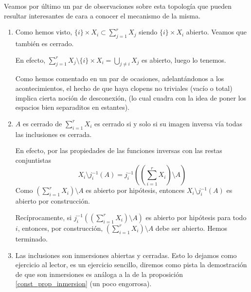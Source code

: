 \begin{obs}
	\label{const_obs_propiedadesSuma}
	Veamos por último un par de observaciones sobre esta topología que pueden resultar interesantes de cara a conocer el mecanismo de la misma.
	\begin{enumerate}
	\item Como hemos visto, $\{i\}\times X_i\subset\sum_{j=1}^r X_j$ siendo $\{i\}\times X_i$ abierto. Veamos que también es cerrado.
	
	En efecto, $\sum_{j=1}^r X_j\setminus \{i\}\times X_i=\bigcup_{j\ne i }X_j$ es abierto, luego lo tenemos.
	
	Como hemos comentado en un par de ocasiones, adelantándonos a los acontecimientos, el hecho de que haya clopens no triviales (vacío o total) implica cierta noción de desconexión, (lo cual cuadra con la idea de poner los espacios bien separaditos en estantes).
	\item $A$ es cerrado de $\sum_{i=1}^rX_i$ es cerrado si y solo si su imagen inversa vía todas las inclusiones es cerrada.
	
	En efecto, por las propiedades de las funciones inversas con las restas conjuntistas
	\[X_i\setminus j_i^{-1}(A) = j_i^{-1}\left(\left(\sum_{i=1}^rX_i\right)\setminus A\right)\]
	Como $(\sum_{i=1}^rX_i)\setminus A$ es abierto por hipótesis, entonces $X_i\setminus j_i^{-1}(A)$ es abierto por construcción.
	
	Recíprocamente, si $j_i^{-1}\left(\left(\sum_{i=1}^rX_i\right)\setminus A\right)$ es abierto por hipótesis para todo $i$, entonces, por construcción, $(\sum_{i=1}^rX_i)\setminus A$ debe ser abierto. Hemos terminado.  
	\item Las inclusiones son inmersiones abiertas y cerradas. Esto lo dejamos como ejercicio al lector, es un ejercicio sencillo, diremos como pista la demostración de que son inmersiones es análoga a la de la proposición \ref{const_prop_inmersion} (un poco engorrosa). \qedhere
\end{enumerate}
\end{obs}
